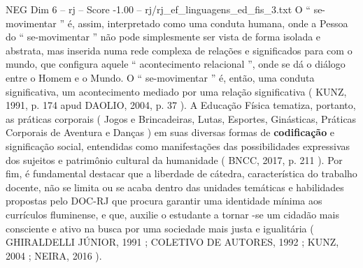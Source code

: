 \begin{textsample}{NEG Dim 6 – rj – Score -1.00 – rj/rj\_ef\_linguagens\_ed\_fis\_3.txt}
O “ se-movimentar ” é, assim, interpretado como uma conduta humana, onde a Pessoa do “ se-movimentar ” não pode simplesmente ser vista de forma isolada e abstrata, mas inserida numa rede complexa de relações e significados para com o mundo, que configura aquele “ acontecimento relacional ”, onde se dá o diálogo entre o Homem e o Mundo.
O “ se-movimentar ” é, então, uma conduta significativa, um acontecimento mediado por uma relação significativa ( KUNZ, 1991, p. 174 apud DAOLIO, 2004, p. 37 ).
A Educação Física tematiza, portanto, as práticas corporais ( Jogos e Brincadeiras, Lutas, Esportes, Ginásticas, Práticas Corporais de Aventura e Danças ) em suas diversas formas de \textbf{codificação} e significação social, entendidas como manifestações das possibilidades expressivas dos sujeitos e patrimônio cultural da humanidade ( BNCC, 2017, p. 211 ).
Por fim, é fundamental destacar que a liberdade de cátedra, característica do trabalho docente, não se limita ou se acaba dentro das unidades temáticas e habilidades propostas pelo DOC-RJ que procura garantir uma identidade mínima aos currículos fluminense, e que, auxilie o estudante a tornar -se um cidadão mais consciente e ativo na busca por uma sociedade mais justa e igualitária ( GHIRALDELLI JÚNIOR, 1991 ; COLETIVO DE AUTORES, 1992 ; KUNZ, 2004 ; NEIRA, 2016 ).

\end{textsample}
